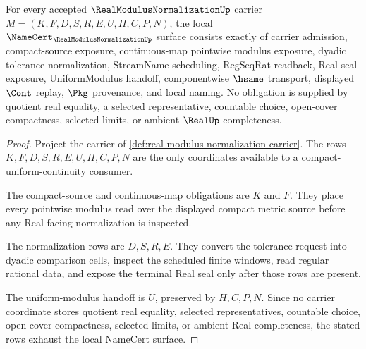 \begin{theorem}
\label{thm:real-modulus-normalization-namecert-obligations}
For every accepted $\RealModulusNormalizationUp$ carrier $M=(K,F,D,S,R,E,U,H,C,P,N)$, the local $\NameCert_{\RealModulusNormalizationUp}$ surface consists exactly of carrier admission, compact-source exposure, continuous-map pointwise modulus exposure, dyadic tolerance normalization, StreamName scheduling, RegSeqRat readback, Real seal exposure, UniformModulus handoff, componentwise $\hsame$ transport, displayed $\Cont$ replay, $\Pkg$ provenance, and local naming. No obligation is supplied by quotient real equality, a selected representative, countable choice, open-cover compactness, selected limits, or ambient $\RealUp$ completeness.
\end{theorem}
\begin{proof}
Project the carrier of \autoref{def:real-modulus-normalization-carrier}. The rows $K,F,D,S,R,E,U,H,C,P,N$ are the only coordinates available to a compact-uniform-continuity consumer.

The compact-source and continuous-map obligations are $K$ and $F$. They place every pointwise modulus read over the displayed compact metric source before any Real-facing normalization is inspected.

The normalization rows are $D,S,R,E$. They convert the tolerance request into dyadic comparison cells, inspect the scheduled finite windows, read regular rational data, and expose the terminal Real seal only after those rows are present.

The uniform-modulus handoff is $U$, preserved by $H,C,P,N$. Since no carrier coordinate stores quotient real equality, selected representatives, countable choice, open-cover compactness, selected limits, or ambient Real completeness, the stated rows exhaust the local NameCert surface.
\end{proof}

